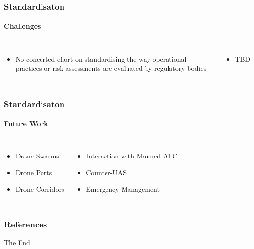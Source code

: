 \documentclass[usenames,dvipsnames,aspectratio=169,serif]{beamer}
\begin{document}
\begin{frame}[fragile] %
   \frametitle{Standardisaton}
   \framesubtitle{Challenges}
   \begin{columns}[t]
      \begin{itemize}
         \item No concerted effort on standardising the way operational practices or risk assessments are evaluated by regulatory bodies
      \end{itemize}
      \begin{itemize}
         \item TBD
      \end{itemize}
   \end{columns}
\end{frame}


\begin{frame}[fragile] %
   \frametitle{Standardisaton}
   \framesubtitle{Future Work}
   \begin{columns}[t]
      \begin{itemize}
         \item Drone Swarms
         \item Drone Ports
         \item Drone Corridors
      \end{itemize}
      \begin{itemize}
         \item Interaction with Manned ATC
         \item Counter-UAS
         \item Emergency Management
      \end{itemize}
   \end{columns}
\end{frame}


\begin{frame}[t, allowframebreaks]
   \frametitle{References}
   {\footnotesize
   

   
   }
\end{frame}


\begin{frame}
   \Huge{\centerline{The End}}
\end{frame}

\end{document}
